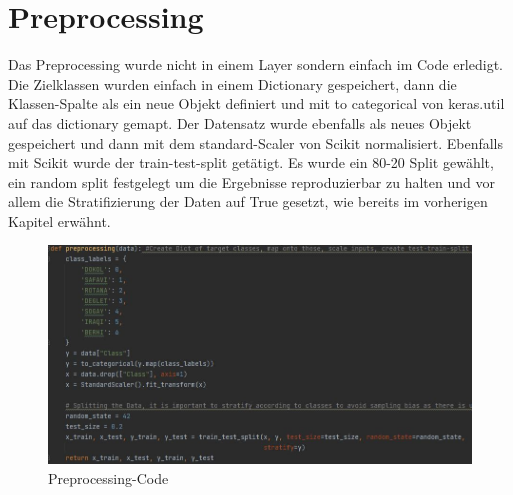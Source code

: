 \documentclass[letterpaper,10pt]{article}
\begin{document}
\section{Preprocessing}
    Das Preprocessing wurde nicht in einem Layer sondern einfach im Code erledigt. Die Zielklassen wurden einfach in einem Dictionary gespeichert, dann die Klassen-Spalte als ein neue Objekt definiert und mit to categorical von keras.util auf das dictionary gemapt. Der Datensatz wurde ebenfalls als neues Objekt gespeichert und dann mit dem standard-Scaler von Scikit \cite{Pedregosa.2011}
    normalisiert. Ebenfalls mit Scikit wurde der train-test-split getätigt. Es wurde ein 80-20 Split gewählt, ein random split festgelegt um die Ergebnisse reproduzierbar zu halten und vor allem die Stratifizierung der Daten auf True gesetzt, wie bereits im vorherigen Kapitel erwähnt.
    \begin{figure} [h]
        \centering
        \includegraphics[width=\textwidth]{Preprocessing.JPG}
        \caption{Preprocessing-Code}
    \end{figure}

\newpage
\end{document}
